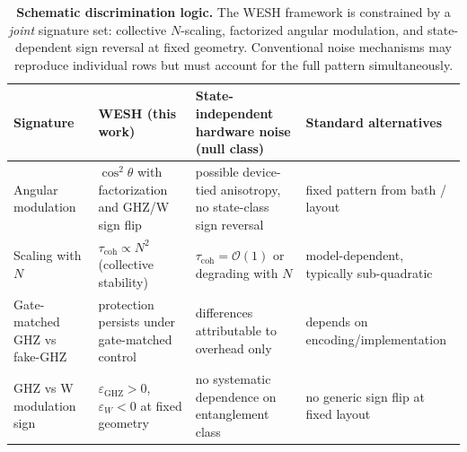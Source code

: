 \documentclass[12pt,a4paper]{article}
\numberwithin{equation}{section}
\begin{document}
\begin{table}[h]
\centering
\footnotesize
\setlength{\tabcolsep}{6pt}
\renewcommand{\arraystretch}{1.2}
\begin{tabularx}{\textwidth}{@{}l
  >{\raggedright\arraybackslash}X
  >{\raggedright\arraybackslash}X
  >{\raggedright\arraybackslash}X@{}}
\toprule
Signature &
WESH (this work) &
State-independent hardware noise (null class) &
Standard alternatives \\ \midrule
Angular modulation &
$\cos^2\theta$ with factorization
and GHZ/W sign flip &
possible device-tied anisotropy,
no state-class sign reversal &
fixed pattern from bath / layout \\[2pt]
Scaling with $N$ &
$\tau_{\mathrm{coh}}\propto N^2$ (collective stability) &
$\tau_{\mathrm{coh}}=\mathcal O(1)$ or degrading with $N$ &
model-dependent, typically sub-quadratic \\[2pt]
Gate-matched GHZ vs fake-GHZ &
protection persists under gate-matched control &
differences attributable to overhead only &
depends on encoding/implementation \\[2pt]
GHZ vs W modulation sign &
$\varepsilon_{\mathrm{GHZ}}>0$, $\varepsilon_{W}<0$ at fixed geometry &
no systematic dependence on entanglement class &
no generic sign flip at fixed layout \\ \bottomrule
\end{tabularx}
\caption{\textbf{Schematic discrimination logic.}  
The WESH framework is constrained by a \emph{joint} signature set:
collective $N$-scaling, factorized angular modulation, and
state-dependent sign reversal at fixed geometry.
Conventional noise mechanisms may reproduce individual rows but must account
for the full pattern simultaneously.}
\label{tab:discrimination}
\end{table}
\end{document}

